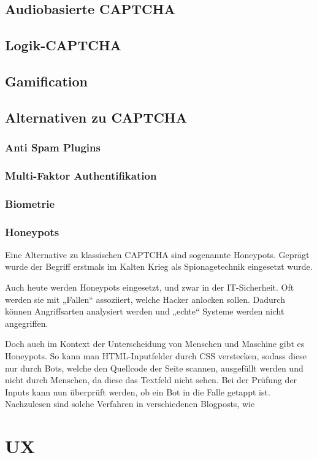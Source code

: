 \subsection{Audiobasierte CAPTCHA}
\subsection{Logik-CAPTCHA}
\subsection{Gamification}
\subsection{Alternativen zu CAPTCHA}
\subsubsection{Anti Spam Plugins}
\subsubsection{Multi-Faktor Authentifikation}
\subsubsection{Biometrie}
\subsubsection{Honeypots}

Eine Alternative zu klassischen CAPTCHA sind sogenannte Honeypots. 
Geprägt wurde der Begriff erstmals im Kalten Krieg als Spionagetechnik eingesetzt wurde. \cite[p.2]{joshi:2011} 

Auch heute werden Honeypots eingesetzt, und zwar in der IT-Sicherheit. 
Oft werden sie mit „Fallen“ assoziiert, welche Hacker anlocken sollen. 
Dadurch können Angriffsarten analysiert werden und „echte“ Systeme werden nicht angegriffen.

Doch auch im Kontext der Unterscheidung von Menschen und Maschine gibt es Honeypots. 
So kann man HTML-Inputfelder durch CSS verstecken, sodass diese nur durch Bots, welche den Quellcode der Seite scannen, ausgefüllt werden 
und nicht durch Menschen, da diese das Textfeld nicht sehen. 
Bei der Prüfung der Inputs kann nun überprüft werden, ob ein Bot in die Falle getappt ist. 
Nachzulesen sind solche Verfahren in verschiedenen Blogposts, wie %


\section{UX}

